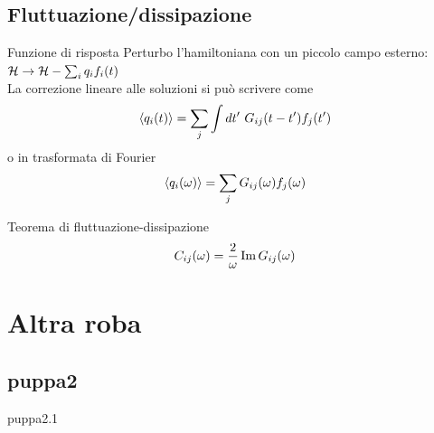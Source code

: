 \documentclass[10pt]{beamer}
\begin{document}
\subsection{Fluttuazione/dissipazione}
\begin{frame}{Funzione di risposta}
Perturbo l'hamiltoniana con un piccolo campo esterno: $ \mathcal{H} \rightarrow \mathcal{H} - \sum_i q_i f_i(t)$\\
La correzione lineare alle soluzioni si può scrivere come
\begin{equation*}
  \mean{q_i(t)} = \sum_j \int dt' \ G_{ij}(t-t')f_j(t') 
\end{equation*}
o in trasformata di Fourier
\begin{equation*}
  \left \langle q_i(\omega) \right \rangle = \sum_j G_{ij}(\omega)f_j(\omega) 
\end{equation*}

\pause
\begin{block}{Teorema di fluttuazione-dissipazione}
\begin{equation*}
  C_{ij}(\omega) = \frac{2}{\omega}\operatorname{Im} G_{ij}(\omega)
\end{equation*}
  
\end{block}


\end{frame}



\section{Altra roba}
\subsection{puppa2}
\begin{frame}{puppa2.1}
 
\end{frame}
\end{document}
